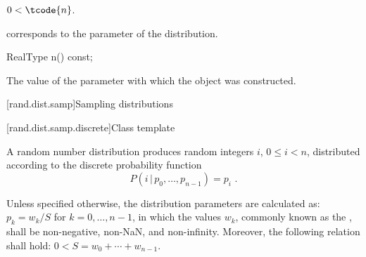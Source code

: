 \begin{itemdescr}
\pnum
\expects
$0 < \tcode{n}$.

\pnum
\remarks
{} corresponds to the parameter of the distribution.
\end{itemdescr}

\begin{indexed}{}
\begin{itemdecl}
RealType n() const;
\end{itemdecl}
\end{indexed}

\begin{itemdescr}
\pnum
\returns
The value of the  parameter
 with which the object was constructed.
\end{itemdescr}%
%



[rand.dist.samp]{Sampling distributions}%
%



[rand.dist.samp.discrete]{Class template }%
%
%

\pnum
A  random number distribution
produces random integers $i$, $0 \leq i < n$,
distributed according to
the discrete probability function%
%
%
\[  P(i \,|\, p_0, \dotsc, p_{n-1}) = p_i \text{ .} \]

\pnum
Unless specified otherwise,
the distribution parameters are calculated as:
$p_k = {w_k / S}$ for $k = 0, \dotsc, n - 1$,
in which the values $w_k$,
commonly known as the %
%
%
, shall be non-negative, non-NaN, and non-infinity.
Moreover, the following relation shall hold:
$0 < S = w_0 + \dotsb + w_{n - 1}$.

